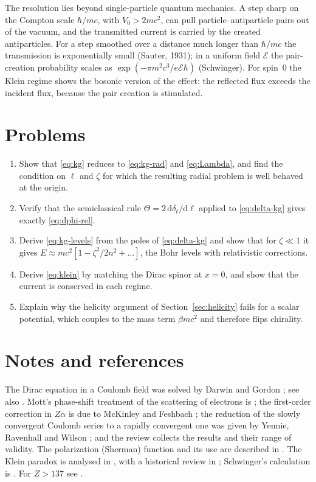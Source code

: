 \documentclass[11pt,a4paper]{book}
\numberwithin{equation}{chapter}
\newcommand{\dd}{\mathrm{d}}
\begin{document}
The resolution lies beyond single-particle quantum mechanics. A step sharp on the
Compton scale $\hbar/mc$, with $V_0>2mc^2$, can pull particle--antiparticle pairs
out of the vacuum, and the transmitted current is carried by the created
antiparticles. For a step smoothed over a distance much longer than $\hbar/mc$ the
transmission is exponentially small (Sauter, 1931); in a uniform field
$\mathcal E$ the pair-creation probability scales as
$\exp(-\pi m^2c^3/e\mathcal E\hbar)$ (Schwinger). For spin~0 the Klein regime
shows the bosonic version of the effect: the reflected flux exceeds the incident
flux, because the pair creation is stimulated.

\section{Problems}
\begin{enumerate}
  \item Show that \eqref{eq:kg} reduces to \eqref{eq:kg-rad} and
        \eqref{eq:Lambda}, and find the condition on $\ell$ and $\zeta$ for which
        the resulting radial problem is well behaved at the origin.
  \item Verify that the semiclassical rule $\Theta=2\,\dd\delta_\ell/\dd\ell$
        applied to \eqref{eq:delta-kg} gives exactly \eqref{eq:dphi-rel}.
  \item Derive \eqref{eq:kg-levels} from the poles of \eqref{eq:delta-kg} and
        show that for $\zeta\ll1$ it gives
        $E\approx mc^2[1-\zeta^2/2n^2+\dots]$, the Bohr levels with relativistic
        corrections.
  \item Derive \eqref{eq:klein} by matching the Dirac spinor at $x=0$, and show
        that the current is conserved in each regime.
  \item Explain why the helicity argument of Section~\ref{sec:helicity} fails
        for a scalar potential, which couples to the mass term $\beta mc^2$ and
        therefore flips chirality.
\end{enumerate}

\section*{Notes and references}
The Dirac equation in a Coulomb field was solved by Darwin and Gordon \cite{Darwin28,GordonA}; see also \cite{BetheSalpeter,Rose,BLP}. Mott's phase-shift treatment of the scattering of electrons is \cite{Mott29}; the first-order correction in $Z\alpha$ is due to McKinley and Feshbach \cite{McKinley48}; the reduction of the slowly convergent Coulomb series to a rapidly convergent one was given by Yennie, Ravenhall and Wilson \cite{YRW54}; and the review \cite{Motz64} collects the results and their range of validity. The polarization (Sherman) function and its use are described in \cite{Sherman56,GayDunning}. The Klein paradox is analysed in \cite{Klein29,Sauter31,Hansen81}, with a historical review in \cite{Dombey99}; Schwinger's calculation is \cite{Schwinger51}. For $Z>137$ see \cite{Pomeranchuk45,ZP71,Reinhardt77,Greiner}.
\end{document}
